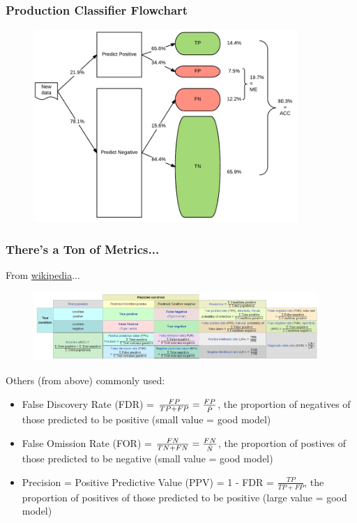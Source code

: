\documentclass[slides]{beamer} %
\begin{document}
\begin{frame}\frametitle{Production Classifier Flowchart}
\begin{figure}
\centering
\includegraphics[width=3.95in]{classifier_flowchart}
\end{figure}
\end{frame}


\begin{frame}\frametitle{There's a Ton of Metrics...}

From \href{https://en.wikipedia.org/wiki/Confusion\_matrix\#Table\_of\_confusion}{wikipedia}... 

\begin{figure}
\centering
\hspace{-0.5cm}\includegraphics[width=4.25in]{confusion_matrix.png}
\end{figure}

\footnotesize
Others (from above) commonly used:

\begin{itemize} \footnotesize
\item False Discovery Rate (FDR) = $\frac{FP}{TP + FP} = \frac{FP}{\hat{P}}$, the proportion of negatives of those predicted to be positive (small value = good model) \pause
\item False Omission Rate (FOR) = $\frac{FN}{TN + FN} = \frac{FN}{\hat{N}}$, the proportion of postives of those predicted to be negative (small value = good model) \pause
\item Precision = Positive Predictive Value (PPV) = 1 - FDR = $\frac{TP}{TP + FP}$, the proportion of positives of those predicted to be positive (large value = good model)
\end{itemize}
	
\end{frame}
\end{document}
